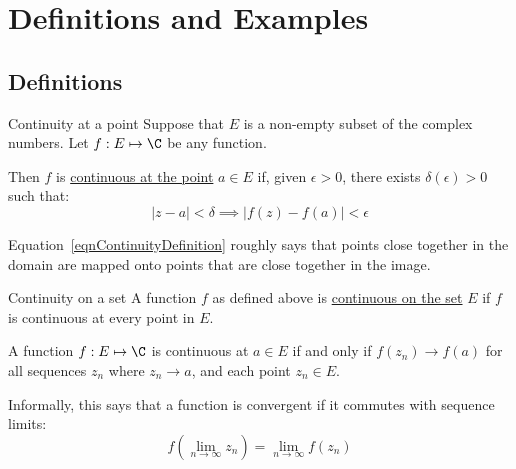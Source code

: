 \documentclass[../Main.tex]{subfiles}
\begin{document}
\section{Definitions and Examples}
\subsection{Definitions}
\begin{definition}{Continuity at a point}
    Suppose that $E$ is a non-empty subset of the complex numbers. Let $f: E \mapsto \C$ be any function.\par
    Then $f$ is \underline{continuous at the point} $a \in E$ if, given $\epsilon > 0$, there exists $\delta(\epsilon) > 0$ such that:
    \begin{equation}
        |z - a| < \delta \implies |f(z) - f(a)| < \epsilon
        \label{eqnContinuityDefinition}
    \end{equation}
\end{definition}
Equation~\ref{eqnContinuityDefinition} roughly says that points close together in the domain are mapped onto points that are close together in the image.
\begin{definition}{Continuity on a set}
    A function $f$ as defined above is \underline{continuous on the set} $E$ if $f$ is continuous at every point in $E$.
\end{definition}
\begin{theorem}
    A function $f : E \mapsto \C$ is continuous at $a \in E$ if and only if $f(z_n) \to f(a)$ for all sequences $z_n$ where $z_n \to a$, and each point $z_n \in E$.
    \label{thmContinuitySequenceDef}
\end{theorem}
Informally, this says that a function is convergent if it commutes with sequence limits:
\begin{equation}
    f(\lim_{n \to \infty}z_n) = \lim_{n \to \infty}f(z_n)
    \label{eqnLimitCommutativity}
\end{equation}
\end{document}
